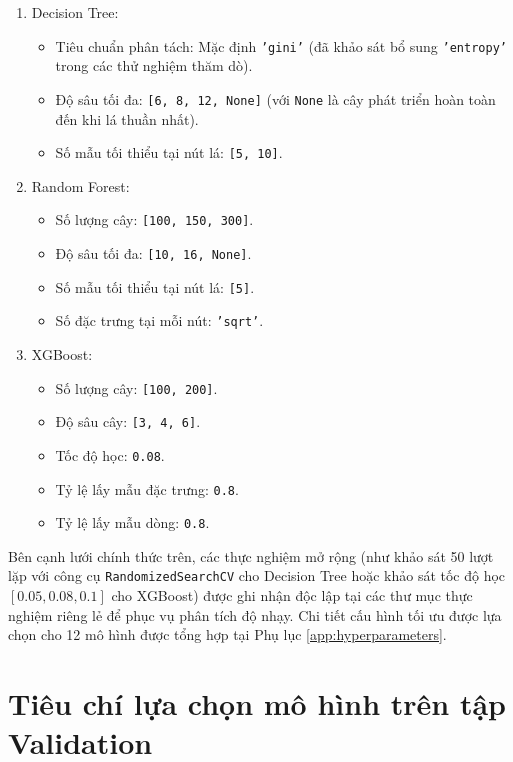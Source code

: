 \begin{enumerate}
    \item Decision Tree:
    \begin{itemize}
        \item Tiêu chuẩn phân tách: Mặc định \texttt{'gini'} (đã khảo sát bổ sung \texttt{'entropy'} trong các thử nghiệm thăm dò).
        \item Độ sâu tối đa: \texttt{[6, 8, 12, None]} (với \texttt{None} là cây phát triển hoàn toàn đến khi lá thuần nhất).
        \item Số mẫu tối thiểu tại nút lá: \texttt{[5, 10]}.
    \end{itemize}
    \item Random Forest:
    \begin{itemize}
        \item Số lượng cây: \texttt{[100, 150, 300]}.
        \item Độ sâu tối đa: \texttt{[10, 16, None]}.
        \item Số mẫu tối thiểu tại nút lá: \texttt{[5]}.
        \item Số đặc trưng tại mỗi nút: \texttt{'sqrt'}.
    \end{itemize}
    \item XGBoost:
    \begin{itemize}
        \item Số lượng cây: \texttt{[100, 200]}.
        \item Độ sâu cây: \texttt{[3, 4, 6]}.
        \item Tốc độ học: \texttt{0.08}.
        \item Tỷ lệ lấy mẫu đặc trưng: \texttt{0.8}.
        \item Tỷ lệ lấy mẫu dòng: \texttt{0.8}.
    \end{itemize}
\end{enumerate}

Bên cạnh lưới chính thức trên, các thực nghiệm mở rộng (như khảo sát 50 lượt lặp với công cụ \texttt{RandomizedSearchCV} cho Decision Tree hoặc khảo sát tốc độ học $[0.05, 0.08, 0.1]$ cho XGBoost) được ghi nhận độc lập tại các thư mục thực nghiệm riêng lẻ để phục vụ phân tích độ nhạy. Chi tiết cấu hình tối ưu được lựa chọn cho 12 mô hình được tổng hợp tại Phụ lục \ref{app:hyperparameters}.

\section{Tiêu chí lựa chọn mô hình trên tập Validation}

